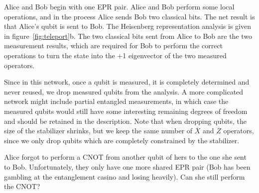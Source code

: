 Alice and Bob begin with one EPR pair.  Alice and Bob perform some
local operations, and in the process Alice sends Bob two classical
bits.  The net result is that Alice's qubit is sent to Bob.  The
Heisenberg representation analysis is given in
figure~\ref{fig:teleport}b.  The two classical bits sent from Alice
to Bob are the two measurement results, which are required for Bob
to perform the correct operations to turn the state into the +1
eigenvector of the two measured operators.

Since in this network, once a qubit is measured, it is completely
determined and never reused, we drop measured qubits from the
analysis.  A more complicated network might include partial entangled
measurements, in which case the measured qubits would still have some
interesting remaining degrees of freedom and should be retained in the
description.  Note that when dropping qubits, the size of the
stabilizer shrinks, but we keep the same number of $\overline{X}$ and
$\overline{Z}$ operators, since we only drop qubits which are
completely constrained by the stabilizer.

\begin{example}
Alice forgot to perform a CNOT from another qubit of hers to the one
she sent to Bob.  Unfortunately, they only have one more shared EPR
pair (Bob has been gambling at the entanglement casino and losing
heavily).  Can she still perform the CNOT?
\end{example}

